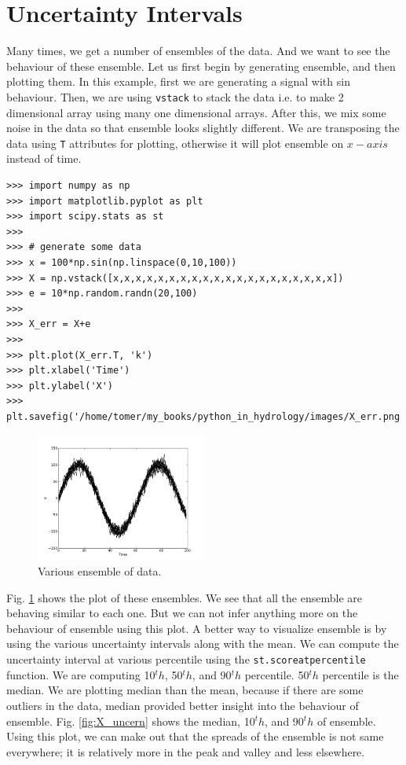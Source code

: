 \documentclass[10pt]{book}
\begin{document}
{\section{Uncertainty Intervals}
Many times, we get a number of ensembles of the data. And we want to see the behaviour of these ensemble. Let us first begin by generating ensemble, and then plotting them. In this example, first we are generating a signal with sin behaviour. Then, we are using \verb"vstack" to stack the data i.e. to make 2 dimensional array using many one dimensional arrays. After this, we mix some noise in the data so that ensemble looks slightly different. We are transposing the data using \verb"T" attributes for plotting, otherwise it will plot ensemble on $x-axis$ instead of time. 
\beforeverb \begin{verbatim}
>>> import numpy as np
>>> import matplotlib.pyplot as plt
>>> import scipy.stats as st
>>> 
>>> # generate some data
>>> x = 100*np.sin(np.linspace(0,10,100))
>>> X = np.vstack([x,x,x,x,x,x,x,x,x,x,x,x,x,x,x,x,x,x,x,x])
>>> e = 10*np.random.randn(20,100) 
>>> 
>>> X_err = X+e
>>> 
>>> plt.plot(X_err.T, 'k')
>>> plt.xlabel('Time')
>>> plt.ylabel('X')
>>> plt.savefig('/home/tomer/my_books/python_in_hydrology/images/X_err.png')
\end{verbatim} \afterverb

\beforefig
\begin{figure}[h!]
  \centering
    \includegraphics[width=0.5\textwidth]{images/X_err.png}
  \caption{Various ensemble of data.}
   \label{fig:X_err}
\end{figure}
\afterfig

Fig. \ref{fig:X_err} shows the plot of these ensembles. We see that all the ensemble are behaving similar to each one. But we can not infer anything more on the behaviour of ensemble using this plot. A better way to visualize ensemble is by using the various uncertainty intervals along with the mean. We can compute the uncertainty interval at various percentile using the \verb"st.scoreatpercentile" function. We are computing 10$^th$, 50$^th$, and 90$^th$ percentile. 50$^th$ percentile is the median. We are plotting median than the mean, because if there are some outliers in the data, median provided better insight into the behaviour of ensemble. Fig. \ref{fig:X_uncern} shows the median,  10$^th$, and 90$^th$ of ensemble. Using this plot, we can make out that the spreads of the ensemble is not same everywhere; it is relatively more in the peak and valley and less elsewhere.

}
\end{document}
